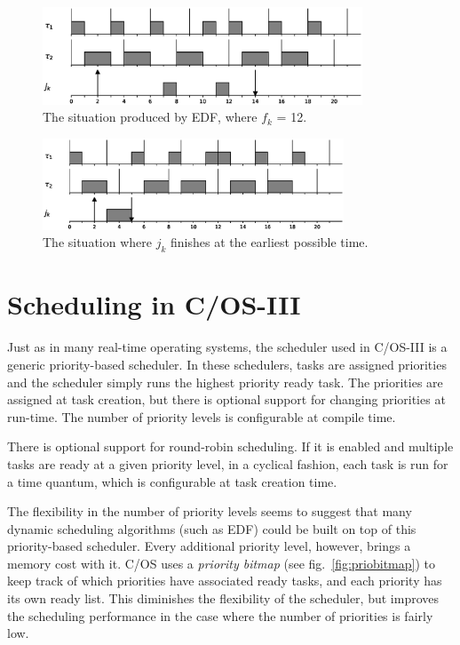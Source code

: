 \documentclass[twoside]{uva-inf-bachelor-thesis}
\newcommand{\ucosiii}{\textmu C/OS-III\xspace}
\newcommand{\ucos}{\textmu C/OS\xspace}
\begin{document}
\begin{figure}[htpb]
    \centering
    \includegraphics[width=0.85\textwidth]{edfdeadline.eps}
    \caption{The situation produced by EDF, where $f_k$ = 12.}
    \label{fig:tbsedfdeadline}
\end{figure}

\begin{figure}[htpb]
    \centering
    \includegraphics[width=0.8\textwidth]{optimaldeadline.eps}
    \caption{The situation where $j_k$ finishes at the earliest possible time.}
    \label{fig:tbsoptimaldeadline}
\end{figure}

\section{Scheduling in \ucosiii}
Just as in many real-time operating systems, the scheduler used in \ucosiii is a generic priority-based scheduler. In these schedulers, tasks are assigned priorities and the scheduler simply runs the highest priority ready task. The priorities are assigned at task creation, but there is optional support for changing priorities at run-time. The number of priority levels is configurable at compile time.

There is optional support for round-robin scheduling. If it is enabled and multiple tasks are ready at a given priority level, in a cyclical fashion, each task is run for a time quantum, which is configurable at task creation time.

The flexibility in the number of priority levels seems to suggest that many dynamic scheduling algorithms (such as EDF) could be built on top of this priority-based scheduler. Every additional priority level, however, brings a memory cost with it. \ucos uses a \textit{priority bitmap} (see fig.~\ref{fig:priobitmap}) to keep track of which priorities have associated ready tasks, and each priority has its own ready list. This diminishes the flexibility of the scheduler, but improves the scheduling performance in the case where the number of priorities is fairly low.
\end{document}
